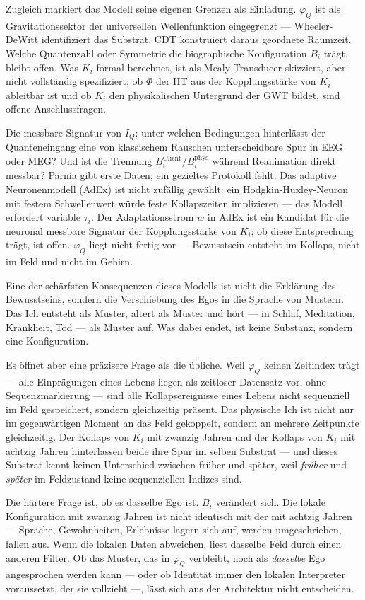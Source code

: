 \documentclass[11pt,a4paper]{article}
\begin{document}
Zugleich markiert das Modell seine eigenen Grenzen als Einladung.
$\varphi_Q$ ist als Gravitationssektor der universellen Wellenfunktion
eingegrenzt — Wheeler-DeWitt identifiziert das Substrat, CDT konstruiert
daraus geordnete Raumzeit. Welche Quantenzahl oder Symmetrie die
biographische Konfiguration $B_i$ trägt, bleibt offen.
Was $K_i$ formal berechnet, ist als Mealy-Transducer skizziert, aber
nicht vollständig spezifiziert; ob $\Phi$ der IIT aus der
Kopplungsstärke von $K_i$ ableitbar ist und ob $K_i$ den physikalischen
Untergrund der GWT bildet, sind offene Anschlussfragen.

Die messbare Signatur von $I_Q$: unter welchen Bedingungen hinterlässt der Quanteneingang eine
von klassischem Rauschen unterscheidbare Spur in EEG oder MEG?
Und ist die Trennung $B_i^{\mathrm{Client}}/B_i^{\mathrm{phys}}$
während Reanimation direkt messbar? Parnia gibt erste Daten;
ein gezieltes Protokoll fehlt. Das adaptive Neuronenmodell (AdEx)
ist nicht zufällig gewählt: ein Hodgkin-Huxley-Neuron mit festem
Schwellenwert würde feste Kollapszeiten implizieren — das Modell
erfordert variable $\tau_i$. Der Adaptationsstrom $w$ in AdEx ist
ein Kandidat für die neuronal messbare Signatur der Kopplungsstärke
von $K_i$; ob diese Entsprechung trägt, ist offen.
$\varphi_Q$ liegt nicht fertig vor —
Bewusstsein entsteht im Kollaps, nicht im Feld und nicht im Gehirn.

Eine der schärfsten Konsequenzen dieses Modells ist nicht die Erklärung des Bewusstseins,
sondern die Verschiebung des Egos in die Sprache von Mustern. Das Ich entsteht als Muster, altert als Muster
und hört — in Schlaf, Meditation, Krankheit, Tod — als Muster auf. Was dabei
endet, ist keine Substanz, sondern eine Konfiguration.

Es öffnet aber eine präzisere Frage als die übliche. Weil $\varphi_Q$ keinen
Zeitindex trägt — alle Einprägungen eines Lebens liegen als zeitloser Datensatz
vor, ohne Sequenzmarkierung —
sind alle Kollapsereignisse eines Lebens nicht sequenziell im Feld gespeichert,
sondern gleichzeitig präsent. Das physische Ich ist nicht nur im gegenwärtigen
Moment an das Feld gekoppelt, sondern an mehrere Zeitpunkte gleichzeitig. Der
Kollaps von $K_i$ mit zwanzig Jahren und der Kollaps von $K_i$ mit achtzig
Jahren hinterlassen beide ihre Spur im selben Substrat — und dieses Substrat
kennt keinen Unterschied zwischen früher und später, weil \emph{früher} und
\emph{später} im Feldzustand keine sequenziellen Indizes sind.

Die härtere Frage ist, ob es dasselbe Ego ist. $B_i$ verändert sich. Die
lokale Konfiguration mit zwanzig Jahren ist nicht identisch mit der mit achtzig
Jahren — Sprache, Gewohnheiten, Erlebnisse lagern sich auf, werden umgeschrieben,
fallen aus. Wenn die lokalen Daten abweichen, liest dasselbe Feld durch einen
anderen Filter. Ob das Muster, das in $\varphi_Q$ verbleibt, noch als
\emph{dasselbe} Ego angesprochen werden kann — oder ob Identität immer den
lokalen Interpreter voraussetzt, der sie vollzieht —, lässt sich aus der
Architektur nicht entscheiden.
\end{document}
